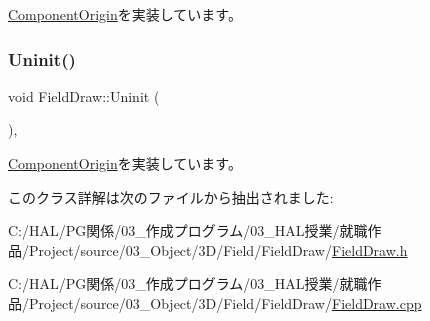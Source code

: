 \mbox{\hyperlink{class_component_origin_a9f674891257f2272b1636d8b6bb05d81}{Component\+Origin}}を実装しています。

\mbox{\label{class_field_draw_a89a78212c141714d9e39e25e663aaeff}} 
\subsubsection{\texorpdfstring{Uninit()}{Uninit()}}
{\footnotesize\ttfamily void Field\+Draw\+::\+Uninit (\begin{DoxyParamCaption}{ }\end{DoxyParamCaption})\hspace{0.3cm}{\ttfamily [override]}, {\ttfamily [virtual]}}



\mbox{\hyperlink{class_component_origin_a9f89a93f9c1954bd53f9750e35e6089d}{Component\+Origin}}を実装しています。



このクラス詳解は次のファイルから抽出されました\+:\begin{DoxyCompactItemize}
\item 
C\+:/\+H\+A\+L/\+P\+G関係/03\+\_\+作成プログラム/03\+\_\+\+H\+A\+L授業/就職作品/\+Project/source/03\+\_\+\+Object/3\+D/\+Field/\+Field\+Draw/\mbox{\hyperlink{_field_draw_8h}{Field\+Draw.\+h}}\item 
C\+:/\+H\+A\+L/\+P\+G関係/03\+\_\+作成プログラム/03\+\_\+\+H\+A\+L授業/就職作品/\+Project/source/03\+\_\+\+Object/3\+D/\+Field/\+Field\+Draw/\mbox{\hyperlink{_field_draw_8cpp}{Field\+Draw.\+cpp}}\end{DoxyCompactItemize}
